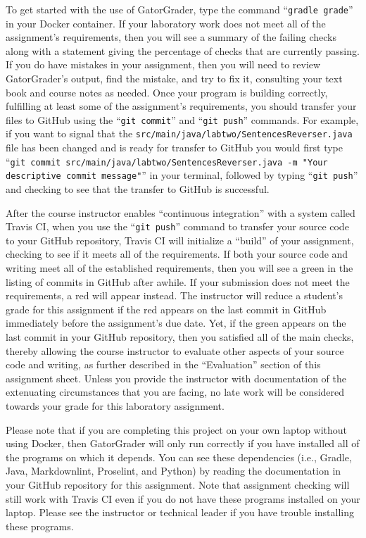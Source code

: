 \documentclass[11pt]{article}
\newcommand{\mainprogramsource}{\lstinline{src/main/java/labtwo/SentencesReverser.java}}
\newcommand{\gatorgraderstart}{\command{gradle grade}}
\newcommand{\gitcommit}{\command{git commit}}
\newcommand{\gitpush}{\command{git push}}
\newcommand{\gitcommitmainprogram}{\command{git commit src/main/java/labtwo/SentencesReverser.java -m "Your
descriptive commit message"}}
\newcommand{\command}[1]{``\lstinline{#1}''}
\newcommand{\step}[1]{``{#1}''}
\newcommand{\checkmark}{\ding{51}}
\newcommand{\naughtmark}{\ding{55}}
\begin{document}
To get started with the use of GatorGrader, type the command \gatorgraderstart{}
in your Docker container. If your laboratory work does not meet all of the
assignment's requirements, then you will see a summary of the failing checks
along with a statement giving the percentage of checks that are currently
passing. If you do have mistakes in your assignment, then you will need to
review GatorGrader's output, find the mistake, and try to fix it, consulting
your text book and course notes as needed. Once your program is building
correctly, fulfilling at least some of the assignment's requirements, you should
transfer your files to GitHub using the \gitcommit{} and \gitpush{} commands.
For example, if you want to signal that the \mainprogramsource{} file has been
changed and is ready for transfer to GitHub you would first type
\gitcommitmainprogram{} in your terminal, followed by typing \gitpush{} and
checking to see that the transfer to GitHub is successful.

After the course instructor enables \step{continuous integration} with a system
called Travis CI, when you use the \gitpush{} command to transfer your source
code to your GitHub repository, Travis CI will initialize a \step{build} of
your assignment, checking to see if it meets all of the requirements. If both
your source code and writing meet all of the established requirements, then you
will see a green \checkmark{} in the listing of commits in GitHub after awhile.
If your submission does not meet the requirements, a red \naughtmark{} will
appear instead. The instructor will reduce a student's grade for this
assignment if the red \naughtmark{} appears on the last commit in GitHub
immediately before the assignment's due date. Yet, if the green \checkmark{}
appears on the last commit in your GitHub repository, then you satisfied all of
the main checks, thereby allowing the course instructor to evaluate other
aspects of your source code and writing, as further described in the
\step{Evaluation} section of this assignment sheet. Unless you provide the
instructor with documentation of the extenuating circumstances that you are
facing, no late work will be considered towards your grade for this laboratory
assignment.

Please note that if you are completing this project on your own laptop without
using Docker, then GatorGrader will only run correctly if you have installed all
of the programs on which it depends. You can see these dependencies (i.e.,
Gradle, Java, Markdownlint, Proselint, and Python) by reading the documentation
in your GitHub repository for this assignment. Note that assignment checking
will still work with Travis CI even if you do not have these programs installed
on your laptop. Please see the instructor or technical leader if you have
trouble installing these programs.
\end{document}
